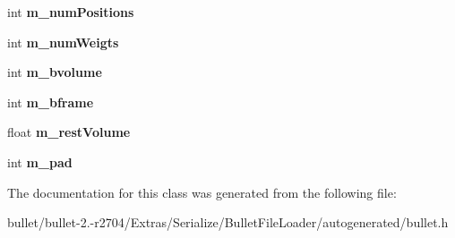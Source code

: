 \begin{DoxyCompactItemize}
\item 
\hypertarget{class_bullet_1_1_soft_body_pose_data_abdc0877f31d1d7aced5b5adf51c0e368}{int {\bfseries m\+\_\+num\+Positions}}\label{class_bullet_1_1_soft_body_pose_data_abdc0877f31d1d7aced5b5adf51c0e368}

\item 
\hypertarget{class_bullet_1_1_soft_body_pose_data_ac1dd657dacc50fa17def15a552f966be}{int {\bfseries m\+\_\+num\+Weigts}}\label{class_bullet_1_1_soft_body_pose_data_ac1dd657dacc50fa17def15a552f966be}

\item 
\hypertarget{class_bullet_1_1_soft_body_pose_data_a68db2cd3b22c3323334706c47520362e}{int {\bfseries m\+\_\+bvolume}}\label{class_bullet_1_1_soft_body_pose_data_a68db2cd3b22c3323334706c47520362e}

\item 
\hypertarget{class_bullet_1_1_soft_body_pose_data_a7e25403c7cfce1c5c5f854d82bd43521}{int {\bfseries m\+\_\+bframe}}\label{class_bullet_1_1_soft_body_pose_data_a7e25403c7cfce1c5c5f854d82bd43521}

\item 
\hypertarget{class_bullet_1_1_soft_body_pose_data_a6026e99caffddc55da445d6294e39851}{float {\bfseries m\+\_\+rest\+Volume}}\label{class_bullet_1_1_soft_body_pose_data_a6026e99caffddc55da445d6294e39851}

\item 
\hypertarget{class_bullet_1_1_soft_body_pose_data_a6bc4f40abcdaeb21647109e56eab2d3c}{int {\bfseries m\+\_\+pad}}\label{class_bullet_1_1_soft_body_pose_data_a6bc4f40abcdaeb21647109e56eab2d3c}

\end{DoxyCompactItemize}


The documentation for this class was generated from the following file\+:\begin{DoxyCompactItemize}
\item 
bullet/bullet-\/2.-\/r2704/\+Extras/\+Serialize/\+Bullet\+File\+Loader/autogenerated/bullet.\+h\end{DoxyCompactItemize}
